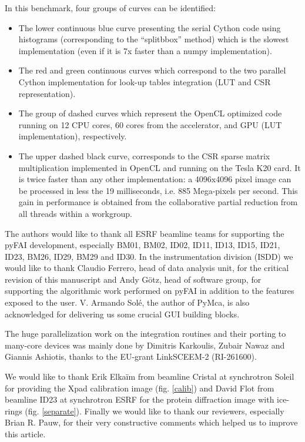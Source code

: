 \documentclass{iucr}
\begin{document}
In this benchmark, four groups of curves can be identified:
\begin{itemize}
  \item The lower continuous blue curve presenting the serial Cython code using
  histograms (corresponding to the ``splitbbox'' method) which is the slowest
  implementation (even if it is 7x faster than a numpy implementation).
  \item The red and green continuous curves which correspond to the two parallel
  Cython implementation for look-up tables integration (LUT and CSR
  representation).
  \item The group of dashed curves which represent the OpenCL optimized code
  running on 12 CPU cores, 60 cores from the accelerator, and GPU (LUT
  implementation), respectively.
  \item The upper dashed black curve, corresponds to the CSR sparse matrix
  multiplication implemented in OpenCL and running on the Tesla K20 card.
  It is twice faster than any other implementation: a 4096x4096 pixel
  image can be processed in less the 19 milliseconds, i.e. 885 Mega-pixels
  per second.
  This gain in performance is obtained from the collaborative
  partial reduction from all threads within a workgroup.
\end{itemize}



The authors would like to thank all ESRF beamline teams for supporting the
pyFAI development, especially BM01, BM02, ID02, ID11, ID13, ID15, ID21, ID23,
BM26, ID29, BM29 and ID30.
In the instrumentation division (ISDD) we would like to thank Claudio
Ferrero, head of data analysis unit, for the critical revision of this
manuscript and Andy G\"otz, head of software group, for supporting the
algorithmic work performed on pyFAI in addition to the features exposed to the
user.
V. Armando Solé, the author of PyMca, is also acknowledged for delivering us
some crucial GUI building blocks.

The huge parallelization work on the integration routines and their porting to
many-core devices was mainly done by Dimitris Karkoulis, Zubair Nawaz and Giannis Ashiotis,
thanks to the EU-grant LinkSCEEM-2 (RI-261600).

We would like to thank 
Erik Elka\"im from beamline Cristal at synchrotron Soleil for providing the Xpad   
calibration image (fig. \ref{calib}) and David Flot from beamline ID23 at
synchrotron ESRF for the protein diffraction image with ice-rings (fig.
\ref{separate}).
Finally we would like to thank our reviewers, especially Brian R. Pauw, for
their very constructive comments which helped us to improve this article. 
\end{document}
